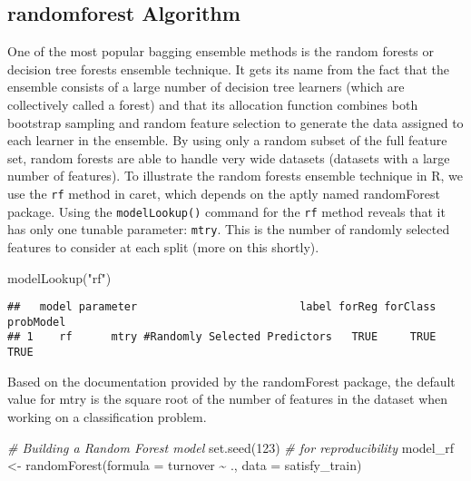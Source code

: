 \documentclass[
]{book}
\newenvironment{Shaded}{\begin{snugshade}}{\end{snugshade}}
\newcommand{\AttributeTok}[1]{\textcolor[rgb]{0.77,0.63,0.00}{#1}}
\newcommand{\CommentTok}[1]{\textcolor[rgb]{0.56,0.35,0.01}{\textit{#1}}}
\newcommand{\DecValTok}[1]{\textcolor[rgb]{0.00,0.00,0.81}{#1}}
\newcommand{\FunctionTok}[1]{\textcolor[rgb]{0.00,0.00,0.00}{#1}}
\newcommand{\NormalTok}[1]{#1}
\newcommand{\OtherTok}[1]{\textcolor[rgb]{0.56,0.35,0.01}{#1}}
\newcommand{\SpecialCharTok}[1]{\textcolor[rgb]{0.00,0.00,0.00}{#1}}
\newcommand{\StringTok}[1]{\textcolor[rgb]{0.31,0.60,0.02}{#1}}
\begin{document}
\hypertarget{randomforest-algorithm-1}{%
\subsection{randomforest Algorithm}\label{randomforest-algorithm-1}}

One of the most popular bagging ensemble methods is the random forests or decision
tree forests ensemble technique. It gets its name from the fact that the ensemble consists of a large number of decision tree learners (which are collectively called a forest) and that its allocation function combines both bootstrap sampling and random feature selection to generate the data assigned to each learner in the ensemble. By using only a random subset of the full feature set, random forests are able to handle very wide datasets (datasets with a large number of features).
To illustrate the random forests ensemble technique in R, we use the \texttt{rf} method
in caret, which depends on the aptly named randomForest package. Using the
\texttt{modelLookup()} command for the \texttt{rf} method reveals that it has only one tunable
parameter: \texttt{mtry}. This is the number of randomly selected features to consider at each split (more on this shortly).

\begin{Shaded}
\begin{Highlighting}[]
\FunctionTok{modelLookup}\NormalTok{(}\StringTok{"rf"}\NormalTok{)}
\end{Highlighting}
\end{Shaded}

\begin{verbatim}
##   model parameter                         label forReg forClass probModel
## 1    rf      mtry #Randomly Selected Predictors   TRUE     TRUE      TRUE
\end{verbatim}

Based on the documentation provided by the randomForest package, the default
value for mtry is the square root of the number of features in the dataset when working on a classification problem.

\begin{Shaded}
\begin{Highlighting}[]
\CommentTok{\# Building a Random Forest model}
\FunctionTok{set.seed}\NormalTok{(}\DecValTok{123}\NormalTok{)  }\CommentTok{\# for reproducibility}
\NormalTok{model\_rf }\OtherTok{\textless{}{-}} \FunctionTok{randomForest}\NormalTok{(}\AttributeTok{formula =}\NormalTok{ turnover }\SpecialCharTok{\textasciitilde{}}\NormalTok{ ., }
                         \AttributeTok{data =}\NormalTok{ satisfy\_train)}
\end{Highlighting}
\end{Shaded}
\end{document}
